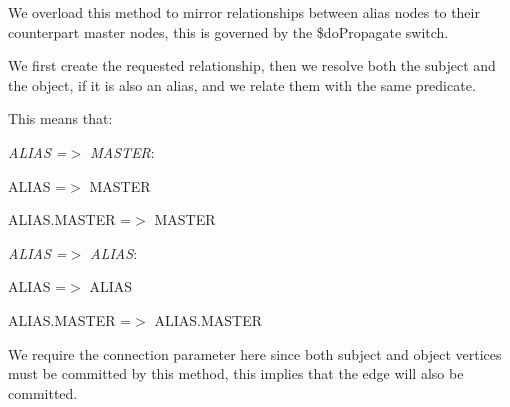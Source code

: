 We overload this method to mirror relationships between alias nodes to their counterpart master nodes, this is governed by the {\ttfamily \$do\-Propagate} switch.

We first create the requested relationship, then we resolve both the subject and the object, if it is also an alias, and we relate them with the same predicate.

This means that\-:


\begin{DoxyItemize}
\item {\itshape A\-L\-I\-A\-S =$>$ M\-A\-S\-T\-E\-R}\-: 
\begin{DoxyItemize}
\item A\-L\-I\-A\-S =$>$ M\-A\-S\-T\-E\-R 
\item A\-L\-I\-A\-S.\-M\-A\-S\-T\-E\-R =$>$ M\-A\-S\-T\-E\-R 
\end{DoxyItemize}
\item {\itshape A\-L\-I\-A\-S =$>$ A\-L\-I\-A\-S}\-: 
\begin{DoxyItemize}
\item A\-L\-I\-A\-S =$>$ A\-L\-I\-A\-S 
\item A\-L\-I\-A\-S.\-M\-A\-S\-T\-E\-R =$>$ A\-L\-I\-A\-S.\-M\-A\-S\-T\-E\-R 
\end{DoxyItemize}
\end{DoxyItemize}

We require the connection parameter here since both subject and object vertices must be committed by this method, this implies that the edge will also be committed.


